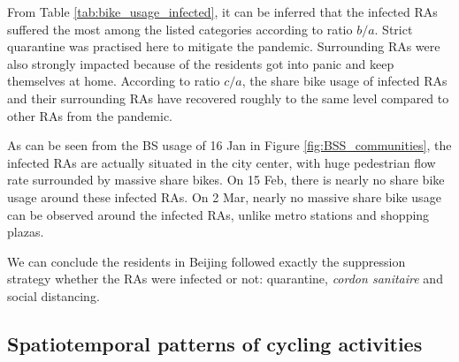 \documentclass[preprints,ijgi,submit,moreauthors]{Definitions/mdpi}
\begin{document}
From Table \ref{tab:bike_usage_infected}, it can be inferred that the infected RAs suffered the most among the listed categories according to ratio $b/a$.
Strict quarantine was practised here to mitigate the pandemic.
Surrounding RAs were also strongly impacted because of the residents got into panic and keep themselves at home.
According to ratio $c/a$, the share bike usage of infected RAs and their surrounding RAs have recovered roughly to the same level compared to other RAs from the pandemic.

As can be seen from the BS usage of 16 Jan in Figure \ref{fig:BSS_communities}, the infected RAs are actually situated in the city center, with huge pedestrian flow rate surrounded by massive share bikes.
On 15 Feb, there is nearly no share bike usage around these infected RAs.
On 2 Mar, nearly no massive share bike usage can be observed around the infected RAs, unlike metro stations and shopping plazas.

We can conclude the residents in Beijing followed exactly the suppression strategy whether the RAs were infected or not: quarantine, \textit{cordon sanitaire} and social distancing.

\subsection{Spatiotemporal patterns of cycling activities}
\end{document}
